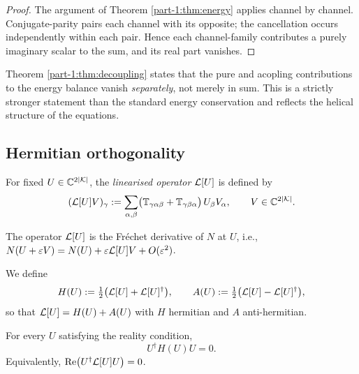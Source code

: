 \begin{proof}
The argument of Theorem \ref{part-1:thm:energy} applies channel by channel. 
Conjugate-parity pairs each channel with its opposite; the cancellation 
occurs independently within each pair. Hence each channel-family 
contributes a purely imaginary scalar to the sum, and its real part 
vanishes. 
\end{proof}

\begin{remark}\label{part-1:rem:decoupling-meaning}
Theorem \ref{part-1:thm:decoupling} states that the pure and acopling 
contributions to the energy balance vanish \emph{separately}, not merely 
in sum. This is a strictly stronger statement than the standard energy 
conservation and reflects the helical structure of the equations.
\end{remark}

\subsection{Hermitian orthogonality}
\label{part-1:ssec:hermitian}

\begin{definition}\label{part-1:def:L}
For fixed $U\in\mathbb{C}^{2\left\lvert \mathcal{K} \right\rvert}$, the \emph{linearised operator} 
$\mathcal{L}[U]$ is defined by
\begin{equation}\label{part-1:eq:L-def}
(\mathcal{L}[U] V)_\gamma 
:= \sum_{\alpha,\beta} \bigl(\mathbb{T}_{\gamma\alpha\beta} + \mathbb{T}_{\gamma\beta\alpha}\bigr)\, 
U_\beta V_\alpha,
\qquad V\in\mathbb{C}^{2\left\lvert \mathcal{K} \right\rvert}.
\end{equation}
\end{definition}

The operator $\mathcal{L}[U]$ is the Fr\'echet derivative of $N$ at $U$, 
i.e., $N(U+\varepsilon V) = N(U) + \varepsilon \mathcal{L}[U] V + O(\varepsilon^2)$.

\begin{definition}\label{part-1:def:H-A}
We define
\begin{equation}\label{part-1:eq:HA}
H(U) := \tfrac{1}{2}\bigl(\mathcal{L}[U] + \mathcal{L}[U]^\dagger\bigr),
\qquad
A(U) := \tfrac{1}{2}\bigl(\mathcal{L}[U] - \mathcal{L}[U]^\dagger\bigr),
\end{equation}
so that $\mathcal{L}[U] = H(U) + A(U)$ with $H$ hermitian and $A$ anti-hermitian.
\end{definition}

\begin{theorem}\label{part-1:thm:H-orth}
For every $U$ satisfying the reality condition,
\begin{equation}\label{part-1:eq:H-orth}
\boxed{
U^\dagger H(U) U = 0.
}
\end{equation}
Equivalently, $\mathrm{Re}\bigl(U^\dagger \mathcal{L}[U] U\bigr) = 0$.
\end{theorem}

